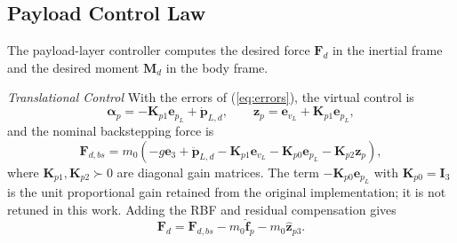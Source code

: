 \documentclass[Review,sageh,times]{sagej}
\begin{document}
\subsection*{Payload Control Law}

The payload-layer controller computes the desired force $\mathbf{F}_d$ in the
inertial frame and the desired moment $\mathbf{M}_d$ in the body frame.

\emph{Translational Control} With the errors of (\ref{eq:errors}), the virtual control
is
\begin{equation}
\boldsymbol{\alpha}_p = -\mathbf{K}_{p1}\mathbf{e}_{p_L} + \dot{\mathbf{p}}_{L,d},
\qquad
\mathbf{z}_p = \mathbf{e}_{v_L} + \mathbf{K}_{p1}\mathbf{e}_{p_L},
\label{eq:alphap}
\end{equation}
and the nominal backstepping force is
\begin{equation}
\mathbf{F}_{d,bs} = m_0\left(-g\mathbf{e}_3 + \ddot{\mathbf{p}}_{L,d}
- \mathbf{K}_{p1}\mathbf{e}_{v_L} - \mathbf{K}_{p0}\mathbf{e}_{p_L}
- \mathbf{K}_{p2}\mathbf{z}_p\right),
\label{eq:Fdbs}
\end{equation}
where $\mathbf{K}_{p1},\mathbf{K}_{p2}\succ0$ are diagonal gain matrices. The term
$-\mathbf{K}_{p0}\mathbf{e}_{p_L}$ with $\mathbf{K}_{p0}=\mathbf{I}_3$ is the unit proportional
gain retained from the original implementation; it is not retuned in this
work. Adding the RBF and residual compensation gives
\begin{equation}
\mathbf{F}_d = \mathbf{F}_{d,bs} - m_0\hat{\mathbf{f}}_p - m_0\hat{\mathbf{z}}_{p3}.
\label{eq:Fd}
\end{equation}
\end{document}
